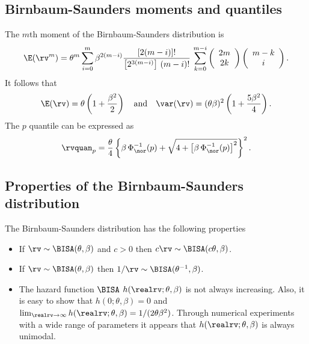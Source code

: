 
\subsection{Birnbaum-Saunders moments and quantiles}
The $m$th moment of the Birnbaum-Saunders distribution is
\begin{displaymath}
\E(\rv^{m})=
\theta^{m}
\sum_{i=0}^{m}
\beta^{2(m-i)}
\frac{[2(m-i)]!}{\left[ 2^{3(m-i)}\right ]\,(m-i)!} \,
\sum_{k=0}^{m-i}
\left (
\begin{array}{c}
2 m
\\
2 k
\end{array}
\right )
\left (
\begin{array}{c}
m-k
\\
i
\end{array}
\right ).
\end{displaymath}
It follows that
\begin{displaymath}
\E(\rv) =  \theta 
	\left (
	1+\frac{\beta^{2}}{2}
	\right )
\quad \mbox{and} \quad 
\var(\rv)= (\theta \beta)^{2}
	\left (
	1+\frac{5 \beta^{2}}{4}
	\right ). 
\end{displaymath}
The  $p$ quantile can be expressed as
\begin{equation}
\label{equation:bisa.quantile}
\rvquan_{p}=
\frac{\theta}{4} 
	\left \{
	 \beta \, \Phi_{\nor}^{-1}(p) + \sqrt{4+ \left [\beta \, 
\Phi_{\nor}^{-1}(p) \right ]^{2}}
	\right \}^{2}.
\end{equation}


\subsection{Properties of the Birnbaum-Saunders distribution}
\label{section:bias.properties}
The Birnbaum-Saunders distribution has the following properties

\begin{itemize} 
\item 
If $\rv \sim \BISA(\theta, \beta)$ and $c>0$ then $c \rv \sim \BISA(c
\theta, \beta)$.  \item If $\rv \sim \BISA(\theta, \beta)$ then $1/\rv
\sim
\BISA(\theta^{-1},\beta)$.  
\item 
The hazard function $\BISA$
$h(\realrv;\theta, \beta)$ is not always increasing. Also, it is easy
to show that
$h(0;\theta, \beta)=0$ and $\lim_{\realrv \to \infty}
h(\realrv;\theta, \beta)=1/(2 \theta
\beta^{2})$. Through numerical experiments with
a wide range of parameters it appears that $h(\realrv;\theta, \beta)$
is always unimodal.
\end{itemize}

